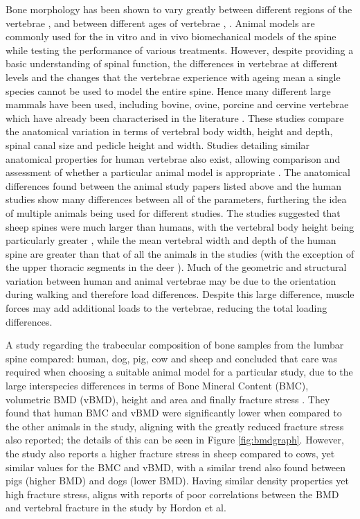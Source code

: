 Bone morphology has been shown to vary greatly between different regions
of the vertebrae \cite{hulme2007regional}, \cite{thomsen2002zone} and between
different ages
of
vertebrae \cite{thomsen2002zone}, \cite{ebbesen1999age}. Animal models are
commonly used for
the in
vitro and in vivo biomechanical models of the spine while testing the
performance of various treatments. However, despite providing a basic
understanding of spinal function, the differences in vertebrae at
different levels and the changes that the vertebrae experience with ageing
mean a single species cannot be used to model the entire spine. Hence
many different large mammals have been used, including bovine, ovine,
porcine and cervine vertebrae which have already been characterised in
the literature \cite{wilke1997sheep,kandziora2001comparison,kumar2000anatomy}. These studies
compare the
anatomical
variation in terms of vertebral body width, height and depth, spinal
canal size and pedicle height and width. Studies detailing similar
anatomical properties for human vertebrae also exist, allowing
comparison and assessment of whether a particular animal model is
appropriate \cite{panjabi1991cervical,Manohar1992}. The
anatomical differences found
between
the animal study papers listed above and the human studies show many
differences between all of the parameters, furthering the idea of
multiple animals being used for different studies. The studies suggested
that sheep spines were much larger than humans, with the vertebral body
height being particularly greater \cite{kumar2000anatomy,kandziora2001comparison}, while the
mean
vertebral width and depth of the human spine are greater than that of
all the animals in the studies (with the exception of the upper thoracic
segments in the deer \cite{kumar2000anatomy}). Much of the geometric and structural variation between human and animal vertebrae may be due to the orientation during walking and therefore load differences. Despite this large difference, muscle forces may add additional loads to the vertebrae, reducing the total loading differences.

A study regarding the trabecular composition of bone samples from the
lumbar spine compared: human, dog, pig, cow and sheep and concluded that
care was required when choosing a suitable animal model for a particular
study, due to the large interspecies differences in terms of Bone Mineral Content (BMC),
volumetric BMD (vBMD), height and area and finally fracture stress
\cite{aerssens_jeroen_boonen_steven_geert_dequeker_1998}. They found that human BMC and vBMD were
significantly lower
when compared to the other animals in the study, aligning with the
greatly reduced fracture stress also reported; the details of this can
be seen in Figure \ref{fig:bmdgraph}. However, the study also reports a
higher fracture
stress in sheep compared to cows, yet similar values for the BMC and
vBMD, with a similar trend also found between pigs (higher BMD) and dogs
(lower BMD). Having similar density properties yet high fracture stress,
aligns with reports of poor correlations between the BMD and vertebral
fracture in the study by Hordon et al\cite{Aaron2000}.



